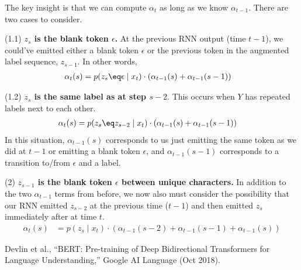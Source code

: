 \documentclass[11pt]{article}
\begin{document}
The key insight is that we can compute $\alpha_t$ as long as we know $\alpha_{t-1}$. There are two cases to consider.
\begin{compactenum}
	\item  (1.1) \textbf{$z_s$ is the blank token $\epsilon$.} At the previous RNN output (time $t - 1$), we could've emitted either a blank token $\epsilon$ or the previous token in the augmented label sequence, $z_{s-1}$. In other words, 
	\begin{align}
		\alpha_t(s) 
			&= p(z_s \eq \epsilon \mid  x_t) \cdot
			\left(   \alpha_{t - 1}(s) + \alpha_{t - 1}(s - 1) \right) 
	\end{align}
	
	\item (1.2) \textbf{$z_s$ is the same label as at step $s - 2$}. This occurs when $Y$ has repeated labels next to each other. 
	\begin{align}
		\alpha_t(s) 
			&= p(z_s \eq z_{s-2} \mid x_t) 
			\cdot \left(   \alpha_{t - 1}(s) + \alpha_{t - 1}(s - 1)   \right)
	\end{align}
	In this situation, $\alpha_{t-1}(s)$ corresponds to us just emitting the same token as we did at $t - 1$ or emitting a blank token $\epsilon$, and $\alpha_{t-1}(s - 1)$ corresponds to a transition to/from $\epsilon$ and a label. 
	
	\item (2) \textbf{$z_{s-1}$ is the blank token $\epsilon$ between unique characters.} In addition to the two $\alpha_{t-1}$ terms from before, we now also must consider the possibility that our RNN emitted $z_{s-2}$ at the previous time ($t-1$) and then emitted $z_s$ immediately after at time $t$.  
	\begin{align}
		\alpha_t(s)
			&= p(z_s \mid x_t) \cdot \left(
				\alpha_{t-1}(s-2) + \alpha_{t-1}(s-1) + \alpha_{t-1}(s)
			\right)
	\end{align}
\end{compactenum}














\vspace{-1em}
{\footnotesize Devlin et al., ``BERT: Pre-training of Deep Bidirectional Transformers for Language Understanding,''  Google AI Language (Oct 2018).}
\end{document}
